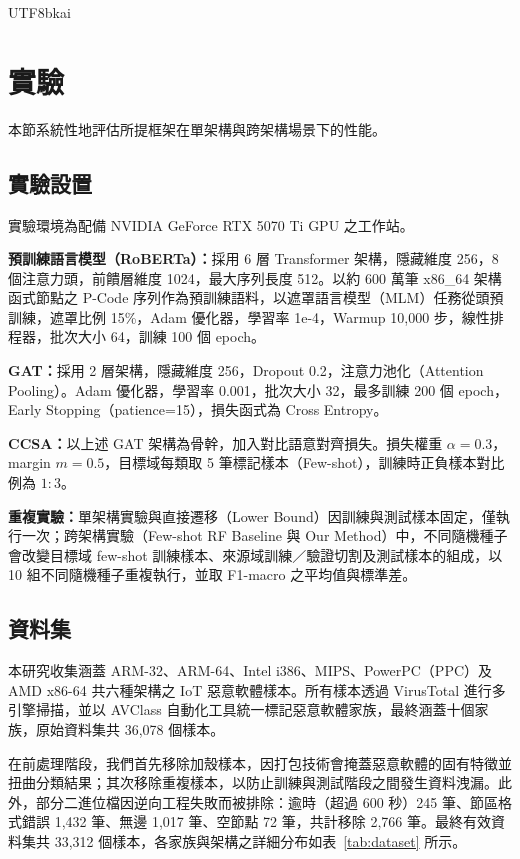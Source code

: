 \documentclass[10pt, a4paper, twocolumn]{article}
\begin{document}
\begin{CJK*}{UTF8}{bkai}
\section{實驗}

本節系統性地評估所提框架在單架構與跨架構場景下的性能。
\subsection{實驗設置}

實驗環境為配備 NVIDIA GeForce RTX 5070 Ti GPU 之工作站。

\textbf{預訓練語言模型（RoBERTa）：}採用 6 層 Transformer 架構，隱藏維度 256，8 個注意力頭，前饋層維度 1024，最大序列長度 512。以約 600 萬筆 x86\_64 架構函式節點之 P-Code 序列作為預訓練語料，以遮罩語言模型（MLM）任務從頭預訓練，遮罩比例 15\%，Adam 優化器，學習率 1e-4，Warmup 10,000 步，線性排程器，批次大小 64，訓練 100 個 epoch。

\textbf{GAT：}採用 2 層架構，隱藏維度 256，Dropout 0.2，注意力池化（Attention Pooling）。Adam 優化器，學習率 0.001，批次大小 32，最多訓練 200 個 epoch，Early Stopping（patience=15），損失函式為 Cross Entropy。

\textbf{CCSA：}以上述 GAT 架構為骨幹，加入對比語意對齊損失。損失權重 $\alpha = 0.3$，margin $m = 0.5$，目標域每類取 5 筆標記樣本（Few-shot），訓練時正負樣本對比例為 $1:3$。

\textbf{重複實驗：}單架構實驗與直接遷移（Lower Bound）因訓練與測試樣本固定，僅執行一次；跨架構實驗（Few-shot RF Baseline 與 Our Method）中，不同隨機種子會改變目標域 few-shot 訓練樣本、來源域訓練／驗證切割及測試樣本的組成，以 10 組不同隨機種子重複執行，並取 F1-macro 之平均值與標準差。


\subsection{資料集}

本研究收集涵蓋 ARM-32、ARM-64、Intel i386、MIPS、PowerPC（PPC）及 AMD x86-64 共六種架構之 IoT 惡意軟體樣本。所有樣本透過 VirusTotal\cite{virustotal2026} 進行多引擎掃描，並以 AVClass\cite{sebastianmilanesinovic2016avclass} 自動化工具統一標記惡意軟體家族，最終涵蓋十個家族，原始資料集共 36,078 個樣本。

在前處理階段，我們首先移除加殼樣本，因打包技術會掩蓋惡意軟體的固有特徵並扭曲分類結果；其次移除重複樣本，以防止訓練與測試階段之間發生資料洩漏。此外，部分二進位檔因逆向工程失敗而被排除：逾時（超過 600 秒）245 筆、節區格式錯誤 1,432 筆、無邊 1,017 筆、空節點 72 筆，共計移除 2,766 筆。最終有效資料集共 33,312 個樣本，各家族與架構之詳細分布如表~\ref{tab:dataset} 所示。


\end{CJK*}
\end{document}
